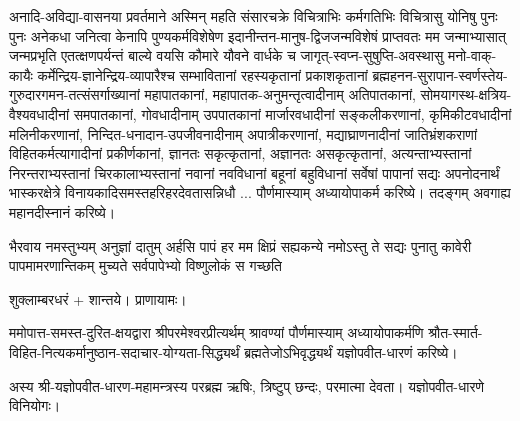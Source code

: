 अनादि-अविद्या-वासनया प्रवर्तमाने अस्मिन् महति संसारचक्रे विचित्राभिः
कर्मगतिभिः विचित्रासु योनिषु पुनः पुनः अनेकधा जनित्वा केनापि पुण्यकर्मविशेषेण
इदानीन्तन-मानुष-द्विजजन्मविशेषं प्राप्त\-वतः मम जन्माभ्यासात् जन्मप्रभृति एतत्क्षण\-पर्यन्तं बाल्ये वयसि
कौमारे यौवने वार्धके च जागृत्-स्वप्न-सुषुप्ति-अवस्थासु मनो-वाक्-कायैः
कर्मेन्द्रिय-ज्ञानेन्द्रिय-व्यापारैश्च सम्भावितानां रहस्यकृतानां प्रकाशकृतानां ब्रह्महनन-सुरापान-स्वर्णस्तेय-गुरुदारगमन-तत्संसर्गाख्यानां महा\-पातकानां, महापातक-अनुमन्तृत्वादीनाम् अति\-पातकानां,
सोमयागस्थ-क्षत्रिय-वैश्य\-वधादीनां सम\-पातकानां, गो\-वधादीनाम् उप\-पातकानां मार्जार\-वधादीनां सङ्कली\-करणानां,
कृमिकीट\-वधादीनां मलिनी\-करणानां, निन्दित-धनादान-उपजीवनादीनाम् अपात्री\-करणानां, मद्याघ्राणनादीनां जातिभ्रंशकराणां विहितकर्मत्यागादीनां
प्रकीर्णकानां, ज्ञानतः सकृत्कृतानां, अज्ञानतः असकृत्कृतानां, अत्यन्ताभ्यस्तानां निरन्तरा\-भ्यस्तानां
चिरकालाभ्यस्तानां नवानां नवविधानां बहूनां बहुविधानां सर्वेषां पापानां सद्यः अपनोदनार्थं
भास्कर\-क्षेत्रे विनायकादि\-समस्त\-हरिहर\-देवतासन्निधौ ... पौर्णमास्याम् अध्यायोपा\-कर्म करिष्ये। तदङ्गम्
अवगाह्य महानदीस्नानं करिष्ये।\\

{भैरवाय नमस्तुभ्यम् अनुज्ञां दातुम् अर्हसि}%
{पापं हर मम क्षिप्रं सह्यकन्ये नमोऽस्तु ते}%
{सद्यः पुनातु कावेरी पापमामरणान्तिकम्}%
{मुच्यते सर्वपापेभ्यो विष्णुलोकं स गच्छति}%




शुक्लाम्बरधरं + शान्तये। प्राणायामः।

ममोपात्त-समस्त-दुरित-क्षयद्वारा श्रीपरमेश्वरप्रीत्यर्थम् श्रावण्यां पौर्णमास्याम् अध्यायोपाकर्मणि 
श्रौत-स्मार्त-विहित-नित्यकर्मानुष्ठान-सदाचार-योग्यता-सिद्ध्यर्थं
ब्रह्मतेजो\-ऽभि\-वृद्ध्यर्थं यज्ञोपवीत-धारणं करिष्ये।

अस्य श्री-यज्ञोपवीत-धारण-महामन्त्रस्य परब्रह्म ऋषिः, त्रिष्टुप् छन्दः, परमात्मा देवता।
यज्ञोपवीत-धारणे विनियोगः।

